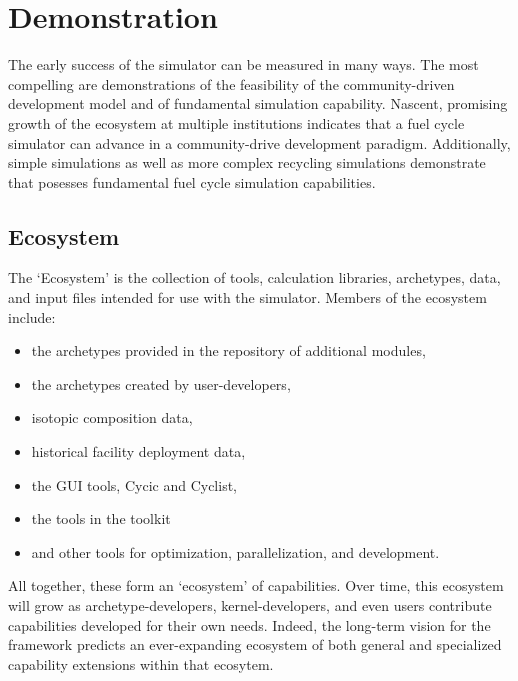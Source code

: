 \section{Demonstration}
%

%


The early success of the \Cyclus simulator can be measured in many ways. 
The most compelling are demonstrations of the feasibility of the \Cyclus community-driven development 
model and of fundamental simulation capability. Nascent, promising growth of the \Cyclus 
ecosystem at multiple institutions indicates that a fuel cycle simulator can 
advance in a community-drive development paradigm. Additionally, simple 
simulations as well as more complex recycling simulations demonstrate that 
\Cyclus posesses fundamental fuel cycle simulation capabilities.

\subsection{Ecosystem}

The \Cyclus `Ecosystem' is the collection of tools, calculation libraries, 
archetypes, data, and input files intended for use with the \Cyclus simulator. 
Members of the ecosystem include:
\begin{itemize}
\item the archetypes provided in the \Cycamore \cite{carlsen_cycamore_2014} 
repository of additional modules,
\item the archetypes created by user-developers,
\item isotopic composition data,
\item historical facility deployment data,
\item the \Cyclus \gls{GUI} tools, Cycic and Cyclist,
\item the tools in the \Cyclus toolkit
\item and other tools for \Cyclus optimization, parallelization, and development.
\end{itemize}
All together, these form an `ecosystem' of capabilities. Over time, this 
ecosystem will grow as archetype-developers, kernel-developers, and 
even users contribute capabilities developed for their own needs. Indeed, the 
long-term vision for the \Cyclus framework predicts an ever-expanding ecosystem 
of both general and specialized capability extensions within that ecosytem. 

